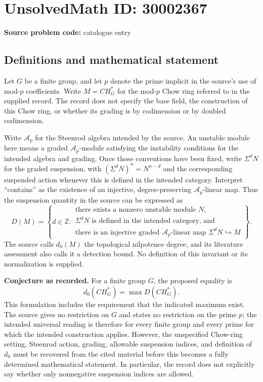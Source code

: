 \documentclass[11pt]{article}
\newcommand{\Z}{\mathbb{Z}}
\begin{document}
\section*{UnsolvedMath ID: 30002367}
\textbf{Source problem code:} catalogue entry
\subsection{Definitions and mathematical statement}
Let \(G\) be a finite group, and let \(p\) denote the prime implicit in the source's use of mod-\(p\) coefficients. Write \(M=CH_G^*\) for the mod-\(p\) Chow ring referred to in the supplied record. The record does not specify the base field, the construction of this Chow ring, or whether its grading is by codimension or by doubled codimension.

Write \(\mathcal A_p\) for the Steenrod algebra intended by the source. An unstable module here means a graded \(\mathcal A_p\)-module satisfying the instability conditions for the intended algebra and grading. Once those conventions have been fixed, write \(\Sigma^d N\) for the graded suspension, with \((\Sigma^d N)^n=N^{n-d}\) and the corresponding suspended action whenever this is defined in the intended category. Interpret ``contains'' as the existence of an injective, degree-preserving \(\mathcal A_p\)-linear map. Thus the suspension quantity in the source can be expressed as
\[
D(M)=\left\{d\in\Z:\begin{array}{l}
\text{there exists a nonzero unstable module }N,\\
\Sigma^dN\text{ is defined in the intended category, and}\\
\text{there is an injective graded }\mathcal A_p\text{-linear map }
\Sigma^dN\hookrightarrow M
\end{array}\right\}.
\]
The source calls \(d_0(M)\) the topological nilpotence degree, and its literature assessment also calls it a detection bound. No definition of this invariant or its normalization is supplied.

\textbf{Conjecture as recorded.} For a finite group \(G\), the proposed equality is
\[
 d_0(CH_G^*)=\max D(CH_G^*).
\]
This formulation includes the requirement that the indicated maximum exist. The source gives no restriction on \(G\) and states no restriction on the prime \(p\); the intended universal reading is therefore for every finite group and every prime for which the intended construction applies. However, the unspecified Chow-ring setting, Steenrod action, grading, allowable suspension indices, and definition of \(d_0\) must be recovered from the cited material before this becomes a fully determined mathematical statement. In particular, the record does not explicitly say whether only nonnegative suspension indices are allowed.
\end{document}
